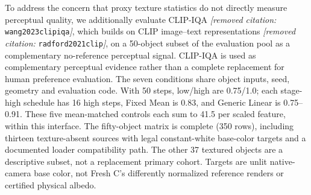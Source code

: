 \documentclass[times,twocolumn,final]{elsarticle}
\providecommand{\DIFadd}[1]{{\protect\color{blue} \sf #1}} %
\providecommand{\DIFdel}[1]{{\protect\color{red} \scriptsize #1}} %
\providecommand{\DIFaddbegin}{} %
\providecommand{\DIFaddend}{} %
\providecommand{\DIFdelbegin}{} %
\providecommand{\DIFdelend}{} %
\begin{document}
\DIFdelbegin %
\DIFdel{To address the concern that proxy texture statistics do not directly measure perceptual quality, we additionally evaluate CLIP-IQA \textit{[removed citation: }\texttt{wang2023clipiqa}\textit{]}, which builds on CLIP image--text representations \textit{[removed citation: }\texttt{radford2021clip}\textit{]}, on a 50-object subset of the evaluation pool as a complementary no-reference perceptual signal. CLIP-IQA is used as complementary perceptual evidence rather than a complete replacement for human preference evaluation. }\DIFdelend \DIFaddbegin \DIFadd{The seven conditions share object inputs, seed, geometry and evaluation code. With 50 steps, low/high are 0.75/1.0; each stage-high schedule has 16 high steps, Fixed Mean is 0.83, and Generic Linear is 0.75--0.91. These five mean-matched controls each sum to 41.5 per scaled feature, within this interface. The fifty-object matrix is complete (350 rows), including thirteen texture-absent sources with legal constant-white base-color targets and a documented loader compatibility path. The other 37 textured objects are a descriptive subset, not a replacement primary cohort. Targets are unlit native-camera base color, not Fresh C's differently normalized reference renders or certified physical albedo.
}\DIFaddend 
\end{document}
